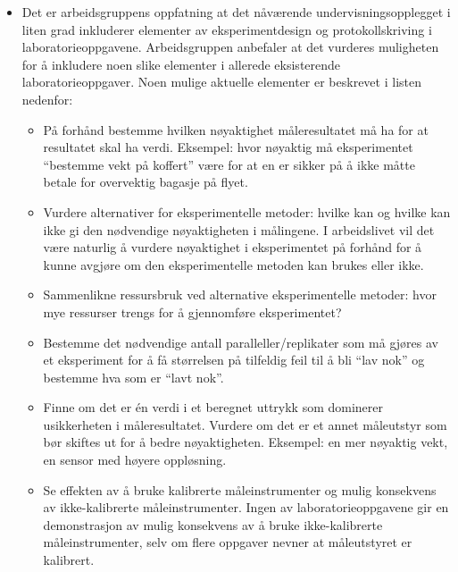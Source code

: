 \documentclass{article}
\begin{document}
\begin{itemize}
  \item Det er arbeidsgruppens oppfatning at det nåværende undervisningsopplegget i liten grad inkluderer elementer av eksperimentdesign og protokollskriving i laboratorieoppgavene. Arbeidsgruppen anbefaler at det vurderes muligheten for å inkludere noen slike elementer i allerede eksisterende laboratorieoppgaver. Noen mulige aktuelle elementer er beskrevet i listen nedenfor:

    \begin{itemize}
      \item På forhånd bestemme hvilken nøyaktighet måleresultatet må ha for at resultatet skal ha verdi. Eksempel: hvor nøyaktig må eksperimentet ``bestemme vekt på koffert'' være for at en er sikker på å ikke måtte betale for overvektig bagasje på flyet.
      \item Vurdere alternativer for eksperimentelle metoder: hvilke kan og hvilke kan ikke gi den nødvendige nøyaktigheten i målingene. I arbeidslivet vil det være naturlig å vurdere nøyaktighet i eksperimentet på forhånd for å kunne avgjøre om den eksperimentelle metoden kan brukes eller ikke. 
      \item Sammenlikne ressursbruk ved alternative eksperimentelle metoder: hvor mye ressurser trengs for å gjennomføre eksperimentet?
      \item Bestemme det nødvendige antall paralleller/replikater som må gjøres av et eksperiment for å få størrelsen på tilfeldig feil til å bli ``lav nok'' og bestemme hva som er ``lavt nok''.
      \item Finne om det er én verdi i et beregnet uttrykk som dominerer usikkerheten i måleresultatet. Vurdere om det er et annet måleutstyr som bør skiftes ut for å bedre nøyaktigheten. Eksempel: en mer nøyaktig vekt, en sensor med høyere oppløsning.
      \item Se effekten av å bruke kalibrerte måleinstrumenter og mulig konsekvens av ikke-kalibrerte måleinstrumenter. Ingen av laboratorieoppgavene gir en demonstrasjon av mulig konsekvens av å bruke ikke-kalibrerte måleinstrumenter, selv om flere oppgaver nevner at måleutstyret er kalibrert.
    \end{itemize}
  \end{itemize}
\end{document}
